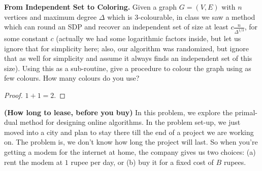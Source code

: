 \documentclass[solution,addpoints,12pt]{exam}
\begin{document}
\begin{questions}


\question[10] \textbf{From Independent Set to Coloring.}  Given a graph $G = (V,E)$ with $n$ vertices and maximum degree $\Delta$ which is $3$-colourable, in class we saw a method which can round an SDP and recover an independent set of size at least $c \frac{n}{\Delta^{1/3}}$, for some constant $c$ (actually we had some logarithmic factors inside, but let us ignore that for simplicity here; also, our algorithm was randomized, but ignore that as well for simplicity and assume it always finds an independent set of this size). Using this as a sub-routine, give a procedure to colour the graph using as few colours. How many colours do you use? 
	
	\begin{solution}
		\begin{proof}
			$1 + 1 = 2$.
		\end{proof}
	\end{solution}

\question[70] \textbf{(How long to lease, before you buy)} In this problem, we explore the primal-dual method for designing online algorithms. In the problem set-up, we just moved into a city and plan to stay there till the end of a project we are working on. The problem is, we don't know how long the project will last. So when you're getting a modem for the internet at home, the company gives us two choices: (a) rent the modem at $1$ rupee per day, or (b) buy it for a fixed cost of $B$ rupees.
\end{questions}
\end{document}
